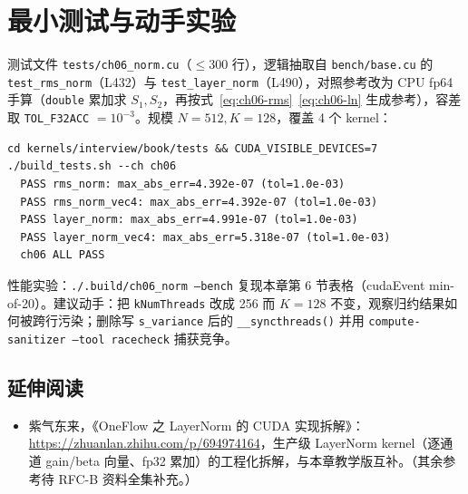 \section{最小测试与动手实验}

测试文件 \texttt{tests/\allowbreak{}ch06\_\allowbreak{}norm.\allowbreak{}cu}（$\le 300$ 行），逻辑抽取自 \texttt{bench/base.cu} 的 \texttt{test\_\allowbreak{}rms\_\allowbreak{}norm}（L432）与 \texttt{test\_\allowbreak{}layer\_\allowbreak{}norm}（L490），对照参考改为 CPU fp64 手算（\texttt{double} 累加求 $S_1, S_2$，再按式~\eqref{eq:ch06-rms}~\eqref{eq:ch06-ln} 生成参考），容差取 \texttt{TOL\_F32ACC} $= 10^{-3}$。规模 $N=512, K=128$，覆盖 4 个 kernel：

\begin{lstlisting}[style=console]
cd kernels/interview/book/tests && CUDA_VISIBLE_DEVICES=7 ./build_tests.sh --ch ch06
  PASS rms_norm: max_abs_err=4.392e-07 (tol=1.0e-03)
  PASS rms_norm_vec4: max_abs_err=4.392e-07 (tol=1.0e-03)
  PASS layer_norm: max_abs_err=4.991e-07 (tol=1.0e-03)
  PASS layer_norm_vec4: max_abs_err=5.318e-07 (tol=1.0e-03)
  ch06 ALL PASS
\end{lstlisting}

性能实验：\texttt{.\allowbreak{}/\allowbreak{}.\allowbreak{}build/\allowbreak{}ch06\_\allowbreak{}norm --bench} 复现本章第 6 节表格（cudaEvent min-of-20）。建议动手：把 \texttt{kNumThreads} 改成 256 而 $K=128$ 不变，观察归约结果如何被跨行污染；删除写 \texttt{s\_variance} 后的 \texttt{\_\allowbreak{}\_\allowbreak{}syncthreads\allowbreak{}()} 并用 \texttt{compute-sanitizer --tool racecheck} 捕获竞争。

\subsection*{延伸阅读}

\begin{itemize}
  \item 紫气东来，《OneFlow 之 LayerNorm 的 CUDA 实现拆解》：\url{https://zhuanlan.zhihu.com/p/694974164}，生产级 LayerNorm kernel（逐通道 gain/beta 向量、fp32 累加）的工程化拆解，与本章教学版互补。（其余参考待 RFC-B 资料全集补充。）
\end{itemize}
